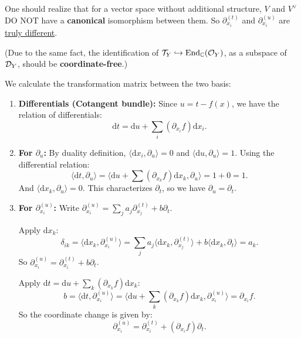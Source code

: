 \begin{example}
\begin{enumerate}
              One should realize that for a vector space without additional structure,
              $V$ and $V^\vee$ DO NOT have a \textbf{canonical} isomorphism between them.
              So $\partial^{(t)}_{x_i}$ and $\partial^{(u)}_{x_i}$ are \underline{truly different}.

              (Due to the same fact, the identification of $\mathcal{T}_Y\hookrightarrow\operatorname{End}_{\mathbb{C}}(\mathcal{O}_Y)$, as a subspace of $\mathcal{D}_Y$, should be \textbf{coordinate-free}.)

              We calculate the transformation matrix between the two basis:

              \begin{enumerate}
                  \item \textbf{Differentials (Cotangent bundle):}
                        Since $u = t - f(x)$, we have the relation of differentials:
                        \[
                            \mathrm{d} t = \mathrm{d} u + \sum_{i} (\partial_{x_i} f) \mathrm{d} x_i.
                        \]

                  \item \textbf{For $\partial_u$:}
                        By duality definition, $\langle \mathrm{d} x_i, \partial_u \rangle = 0$ and $\langle \mathrm{d} u, \partial_u \rangle = 1$.
                        Using the differential relation:
                        \[
                            \langle \mathrm{d} t, \partial_u \rangle = \langle \mathrm{d} u + \sum (\partial_{x_k} f) \mathrm{d} x_k, \partial_u \rangle = 1 + 0 = 1.
                        \]
                        And $\langle \mathrm{d} x_k, \partial_u \rangle = 0$.
                        This characterizes $\partial_t$, so we have $\partial_u = \partial_t$.

                  \item \textbf{For $\partial_{x_i}^{(u)}$:}
                        Write $\partial_{x_i}^{(u)} = \sum_j a_j\partial_{x_j}^{(t)} + b \partial_t$.

                        Apply $\mathrm{d} x_k$:
                        \[
                            \delta_{ik} = \langle \mathrm{d} x_k, \partial_{x_i}^{(u)} \rangle
                            = \sum_j a_j \langle \mathrm{d} x_k, \partial_{x_j}^{(t)} \rangle + b \langle \mathrm{d} x_k, \partial_t \rangle
                            = a_k.
                        \]
                        So $\partial_{x_i}^{(u)} = \partial_{x_i}^{(t)} + b \partial_t$.

                        Apply $\mathrm{d} t = \mathrm{d} u + \sum_k (\partial_{x_k} f) \mathrm{d} x_k$:
                        \[
                            b = \langle \mathrm{d} t, \partial_{x_i}^{(u)} \rangle
                            = \langle \mathrm{d} u + \sum_k (\partial_{x_k} f) \mathrm{d} x_k, \partial_{x_i}^{(u)} \rangle
                            = \partial_{x_i} f.
                        \]
                        So the coordinate change is given by:
                        \[
                            \partial_{x_i}^{(u)} = \partial_{x_i}^{(t)} + (\partial_{x_i} f) \partial_t.
                        \]
              \end{enumerate}


\end{enumerate}
\end{example}
